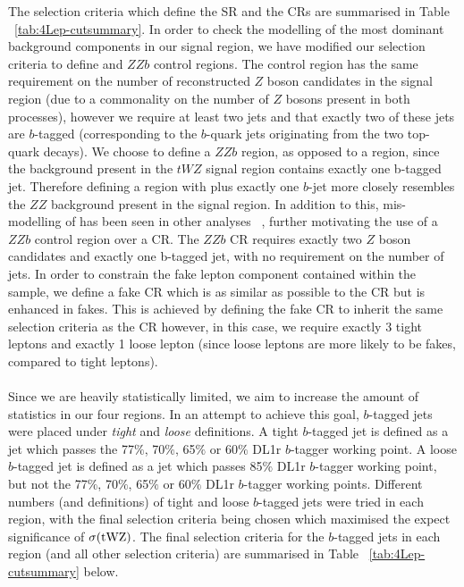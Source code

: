 The selection criteria which define the SR and the CRs are summarised in Table ~\ref{tab:4Lep-cutsummary}. In order to check the modelling of the most dominant background components in our signal region, we have modified our selection criteria to define \ttZ and $ZZb$ control regions. The \ttZ control region has the same requirement on the number of reconstructed $Z$ boson candidates in the signal region (due to a commonality on the number of $Z$ bosons present in both processes), however we require at least two jets and that exactly two of these jets are $b$-tagged (corresponding to the $b$-quark jets originating from the two top-quark decays). We choose to define a $ZZb$ region, as opposed to a \ZZ region, since the \ZZ background present in the $tWZ$ signal region contains exactly one b-tagged jet. Therefore defining a region with \ZZ plus exactly one $b$-jet more closely resembles the $ZZ$ background present in the signal region. In addition to this, mis-modelling of \ZZ has been seen in other analyses ~\cite{Aaboud:2019, ppToZZ:CMSpaper}, further motivating the use of a $ZZb$ control region over a \ZZ CR. The $ZZb$ CR requires exactly two $Z$ boson candidates and exactly one b-tagged jet, with no requirement on the number of jets. In order to constrain the fake lepton component contained within the \ttZ sample, we define a \ttZ fake CR which is as similar as possible to the \ttZ CR but is enhanced in fakes. This is achieved by defining the \ttZ fake CR to inherit the same selection criteria as the \ttZ CR however, in this case, we require exactly 3 tight leptons and exactly 1 loose lepton (since loose leptons are more likely to be fakes, compared to tight leptons).\\\\
Since we are heavily statistically limited, we aim to increase the amount of statistics in our four regions. In an attempt to achieve this goal, $b$-tagged jets were placed under \textit{tight} and \textit{loose} definitions. A tight $b$-tagged jet is defined as a jet which passes the 77$\%$, 70$\%$, 65$\%$ or 60$\%$ DL1r $b$-tagger working point. A loose $b$-tagged jet is defined as a jet which passes 85$\%$ DL1r $b$-tagger working point, but not the 77$\%$, 70$\%$, 65$\%$ or 60$\%$ DL1r $b$-tagger working points. Different numbers (and definitions) of tight and loose $b$-tagged jets were tried in each region, with the final selection criteria being chosen which maximised the expect significance of $\sigma(\tWZ)$. The final selection criteria for the $b$-tagged jets in each region (and all other selection criteria) are summarised in Table ~\ref{tab:4Lep-cutsummary} below.







